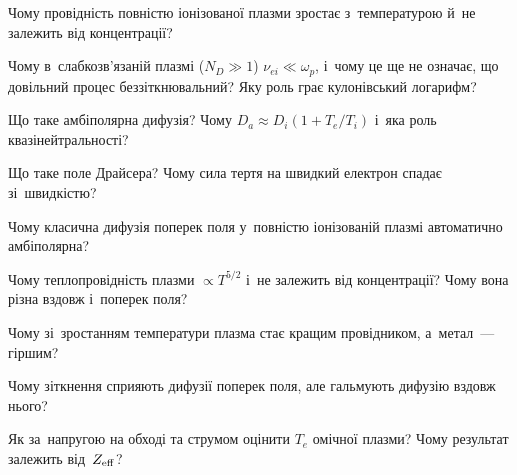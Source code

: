 \begin{Questions}
\begin{quizlist}
\item Чому провідність повністю іонізованої плазми зростає з~температурою й~не
		  залежить від концентрації?

\item Чому в~слабкозв'язаній плазмі ($N_D\gg1$) $\nu_{ei}\ll\omega_p$, і~чому це ще не означає, що
		  довільний процес беззіткнювальний? Яку роль грає кулонівський логарифм?

\item Що таке амбіполярна дифузія? Чому $D_a\approx D_i(1+T_e/T_i)$ і~яка роль
		  квазінейтральності?

\item Що таке поле Драйсера? Чому сила тертя на швидкий електрон спадає зі~швидкістю?

\item Чому класична дифузія поперек поля у~повністю іонізованій плазмі автоматично амбіполярна?

\item Чому теплопровідність плазми $\propto T^{5/2}$ і~не залежить від
		  концентрації? Чому вона різна вздовж і~поперек поля?

\item Чому зі~зростанням температури плазма стає кращим провідником, а~метал~--- гіршим?

\item Чому зіткнення сприяють дифузії поперек поля, але гальмують дифузію вздовж нього?

\item Як за~напругою на обході та струмом оцінити $T_e$ омічної плазми? Чому результат залежить від~$Z_{\rm eff}$?

\end{quizlist}
\end{Questions}

